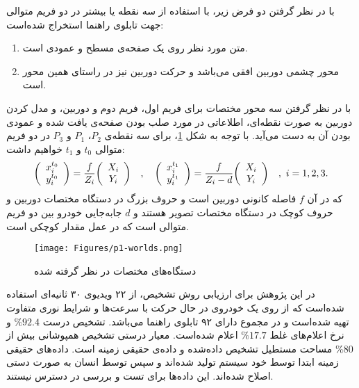 \documentclass[oneside,openany,mscS]{SBU-Thesis}
\begin{document}
	با در نظر گرفتن دو فرض زیر، با استفاده از سه نقطه یا بیشتر در دو فریم متوالی جهت تابلوی راهنما استخراج شده‌است: 
	\begin{enumerate}
		\item متن مورد نظر روی یک صفحه‌ی مسطح و عمودی است.
		\item محور چشمی دوربین افقی می‌باشد و حرکت دوربین نیز در راستای همین محور است.
	\end{enumerate}
	با در نظر گرفتن سه محور مختصات برای فریم اول، فریم دوم و دوربین، و مدل کردن دوربین به صورت نقطه‌ای، اطلاعاتی در مورد صلب بودن صفحه‌ی یافت شده و عمودی بودن آن به دست می‌آید. با توجه به شکل \ref{fig:p1-worlds}، برای سه نقطه‌ی $P_2$، $P_1$ و $P_3$ در دو فریم متوالی $t_0$ و $t_1$ خواهیم داشت: 
	\begin{equation}
	{\left( \begin{array}{c}
		x_i^{t_0} \\
		y_i^{t_0} \end{array} \right) } = {f \over Z_i}
	{
		\left( \begin{array}{c}
		X_i \\
		Y_i \end{array} \right) } \quad , \quad 
	{\left( \begin{array}{c}
		x_i^{t_1} \\
		y_i^{t_1} \end{array} \right) } = {{f} \over {Z_i - d }}
	{
		\left( \begin{array}{c}
		X_i \\
		Y_i \end{array} \right) } \quad , \ i = 1, 2, 3.
	\end{equation}
	که در آن $f$ فاصله کانونی دوربین است و حروف بزرگ در دستگاه مختصات دوربین و حروف کوچک در دستگاه مختصات تصویر هستند و $d$ جابه‌جایی خودرو بین دو فریم متوالی است که در عمل مقدار کوچکی است.
	\begin{figure}[t]
		\centering
		\texttt{[image: Figures/p1-worlds.png]}
		\caption[دستگاه‌های مختصات]{دستگاه‌های مختصات در نظر گرفته شده \cite{Wu2005}}
		\label{fig:p1-worlds}
	\end{figure}
	در این پژوهش برای ارزیابی روش تشخیص، از ۲۲ ویدیوی ۳۰ ثانیه‌ای استفاده شده‌است که از روی یک خودروی در حال حرکت با سرعت‌ها و شرایط نوری متفاوت تهیه شده‌است و در مجموع دارای ۹۲ تابلوی راهنما می‌باشد. تشخیص درست 
	$\% 92.4$ 
	و نرخ اعلام‌های غلط 
	$\% 17.7$
	اعلام شده‌است. معیار درستی تشخیص همپوشانی بیش از $\% 80$ مساحت مستطیل تشخیص‌ داده‌شده و داده‌ی حقیقی زمینه‌ است. داده‌های حقیقی زمینه ابتدا توسط خود سیستم تولید شده‌اند و سپس توسط انسان به صورت دستی اصلاح شده‌اند. این داده‌ها برای تست و بررسی در دسترس نیستند.
\end{document}
